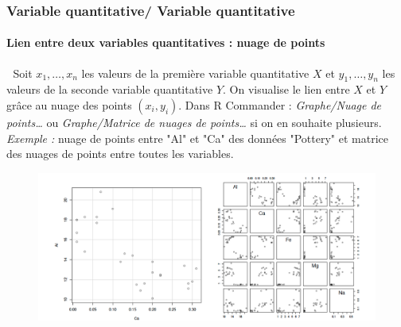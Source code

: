 \subsubsection{Variable quantitative/ Variable quantitative}
\paragraph{Lien entre deux variables quantitatives : nuage de points}
\textcolor{white}{.}\newline
Soit $x_{1},\dots, x_{n}$ les valeurs de la première variable quantitative $X$ et  $y_{1},\dots, y_{n}$ les valeurs de la seconde variable quantitative $Y$.\newline
On visualise le lien entre $X$ et $Y$ grâce au nuage des points $(x_{i},y_{i})$.\newline
Dans R Commander : \textit{Graphe/Nuage de points\dots} ou \textit{Graphe/Matrice de nuages de points\dots} si on en souhaite plusieurs.\newline
\textit{Exemple : }nuage de points entre "Al" et "Ca" des données "Pottery" et matrice des nuages de points entre toutes les variables.
\begin{figure}[H]\begin{center}\includegraphics[scale=0.3]{ilu/ccm17.png}\end{center}\end{figure}
